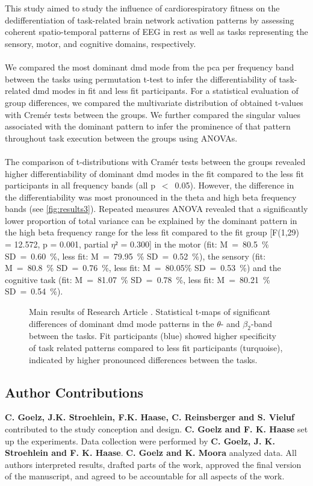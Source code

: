 \\
\\
This study aimed to study the influence of cardiorespiratory fitness on the dedifferentiation of task-related brain network activation patterns by assessing coherent spatio-temporal patterns of EEG in rest as well as tasks representing the sensory, motor, and cognitive domains, respectively.\\
\\
We compared the most dominant \gls{dmd} mode from the \gls{pca} per frequency band between the tasks using permutation t-test to infer the differentiability of task-related \gls{dmd} modes in fit and less fit participants. For a statistical evaluation of group differences, we compared the multivariate distribution of obtained t-values with Cremér tests between the groups. We further compared the singular values associated with the dominant pattern to infer the prominence of that pattern throughout task execution between the groups using ANOVAs.\\
\\
The comparison of t-distributions with Cramér tests between the groups revealed higher differentiability of dominant \gls{dmd} modes in the fit compared to the less fit participants in all frequency bands (all p~$<$~0.05). However, the difference in the differentiability was most pronounced in the theta and high beta frequency bands (see \autoref{fig:results3}). Repeated measures ANOVA revealed that a significantly lower proportion of total variance can be explained by the dominant pattern in the high beta frequency range for the less fit compared to the fit group [F(1,29) = 12.572, p = 0.001, partial $\eta²$ = 0.300] in the motor (fit: M~=~80.5~\% SD~=~0.60~\%, less fit: M~=~79.95~\% SD~=~0.52~\%), the sensory (fit: M~=~80.8~\% SD~=~0.76~\%, less fit: M~=~80.05\% SD~=~0.53~\%) and the cognitive task (fit: M~=~81.07~\% SD~=~0.78~\%, less fit: M~=~80.21~\% SD~=~0.54~\%).
\begin{figure}[h]
    \centering
    
    \caption[Main results of Research Article ]{Main results of Research Article . Statistical t-maps of significant differences of dominant \gls{dmd} mode patterns in the $\theta$- and $\beta_2$-band between the tasks. Fit participants (blue) showed higher specificity of task related patterns compared to less fit participants (turquoise), indicated by higher pronounced differences between the tasks.}
    \label{fig:results3}
\end{figure}

\subsection*{Author Contributions}
\textbf{C. Goelz, J.K. Stroehlein, F.K. Haase, C. Reinsberger and S. Vieluf} contributed to the study conception and design. \textbf{C. Goelz and F. K. Haase} set up the experiments. Data collection were performed by \textbf{C. Goelz, J. K. Stroehlein and F. K. Haase}. \textbf{C. Goelz and K. Moora} analyzed data. All authors interpreted results, drafted parts of the work, approved the final version of the manuscript, and agreed to be accountable for all aspects of the work.